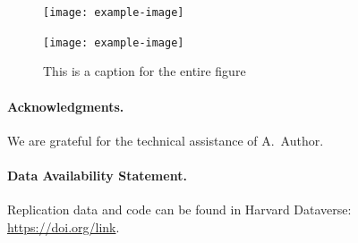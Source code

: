 \documentclass{cup-pan}
\begin{document}
\begin{figure}
\begin{minipage}{0.47\textwidth}
\texttt{[image: example-image]}
\end{minipage}
\hfill
\begin{minipage}{0.47\textwidth}
\texttt{[image: example-image]}
\end{minipage}

\caption{This is a caption for the entire figure}
\label{fig:twosubs}
\end{figure}


\bigskip

\paragraph*{Acknowledgments.} We are grateful for the technical assistance of A.~Author.

\paragraph*{Data Availability Statement.} Replication data and code can be found in Harvard Dataverse: \url{https://doi.org/link}.

\nocite{*}
\printbibliography
\end{document}
